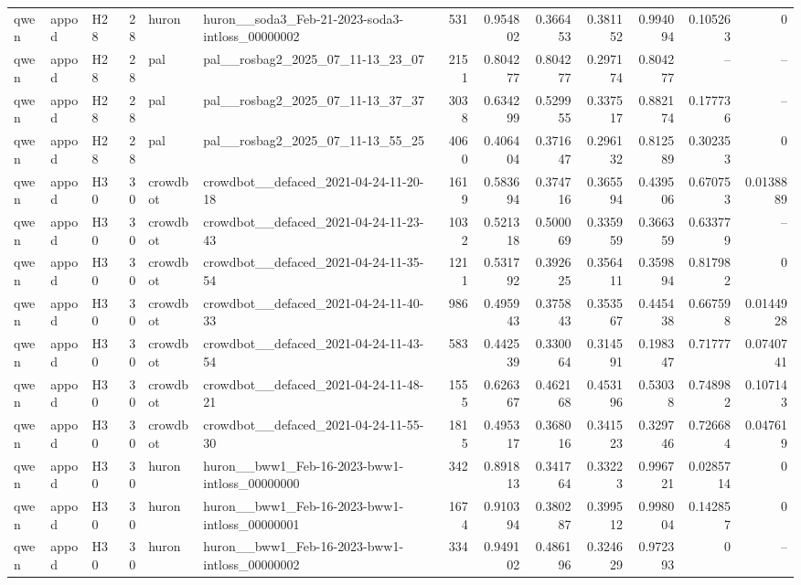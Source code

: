 \begin{longtable}{lllrllrrrrrrr}
qwen & appod & H28 & 28 & huron & huron\_\_soda3\_Feb-21-2023-soda3-intloss\_00000002 & 531 & 0.954802 & 0.366453 & 0.381152 & 0.994094 & 0.105263 & 0 \\
qwen & appod & H28 & 28 & pal & pal\_\_rosbag2\_2025\_07\_11-13\_23\_07 & 2151 & 0.804277 & 0.804277 & 0.297174 & 0.804277 & -- & -- \\
qwen & appod & H28 & 28 & pal & pal\_\_rosbag2\_2025\_07\_11-13\_37\_37 & 3038 & 0.634299 & 0.529955 & 0.337517 & 0.882174 & 0.177736 & -- \\
qwen & appod & H28 & 28 & pal & pal\_\_rosbag2\_2025\_07\_11-13\_55\_25 & 4060 & 0.406404 & 0.371647 & 0.296132 & 0.812589 & 0.302353 & 0 \\
qwen & appod & H30 & 30 & crowdbot & crowdbot\_\_defaced\_2021-04-24-11-20-18 & 1619 & 0.583694 & 0.374716 & 0.365594 & 0.439506 & 0.670753 & 0.0138889 \\
qwen & appod & H30 & 30 & crowdbot & crowdbot\_\_defaced\_2021-04-24-11-23-43 & 1032 & 0.521318 & 0.500069 & 0.335959 & 0.366359 & 0.633779 & -- \\
qwen & appod & H30 & 30 & crowdbot & crowdbot\_\_defaced\_2021-04-24-11-35-54 & 1211 & 0.531792 & 0.392625 & 0.356411 & 0.359894 & 0.817982 & 0 \\
qwen & appod & H30 & 30 & crowdbot & crowdbot\_\_defaced\_2021-04-24-11-40-33 & 986 & 0.495943 & 0.375843 & 0.353567 & 0.445438 & 0.667598 & 0.0144928 \\
qwen & appod & H30 & 30 & crowdbot & crowdbot\_\_defaced\_2021-04-24-11-43-54 & 583 & 0.442539 & 0.330064 & 0.314591 & 0.198347 & 0.71777 & 0.0740741 \\
qwen & appod & H30 & 30 & crowdbot & crowdbot\_\_defaced\_2021-04-24-11-48-21 & 1555 & 0.626367 & 0.462168 & 0.453196 & 0.53038 & 0.748982 & 0.107143 \\
qwen & appod & H30 & 30 & crowdbot & crowdbot\_\_defaced\_2021-04-24-11-55-30 & 1815 & 0.495317 & 0.368016 & 0.341523 & 0.329746 & 0.726684 & 0.047619 \\
qwen & appod & H30 & 30 & huron & huron\_\_bww1\_Feb-16-2023-bww1-intloss\_00000000 & 342 & 0.891813 & 0.341764 & 0.33223 & 0.996721 & 0.0285714 & 0 \\
qwen & appod & H30 & 30 & huron & huron\_\_bww1\_Feb-16-2023-bww1-intloss\_00000001 & 1674 & 0.910394 & 0.380287 & 0.399512 & 0.998004 & 0.142857 & 0 \\
qwen & appod & H30 & 30 & huron & huron\_\_bww1\_Feb-16-2023-bww1-intloss\_00000002 & 334 & 0.949102 & 0.486196 & 0.324629 & 0.972393 & 0 & -- \\

\end{longtable}
